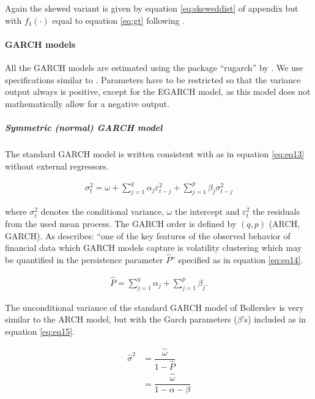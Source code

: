 \documentclass[a4paper, twoside]{templates/ociamthesis}
\begin{document}
\noindent Again the skewed variant is given by equation \eqref{eq:skeweddist} of appendix but with \(f_1(\cdot)\) equal to equation \eqref{eq:gt} following \textcite{trottier2015}.

\hypertarget{garch-models}{%
\paragraph{GARCH models}\label{garch-models}}

All the GARCH models are estimated using the package ``rugarch'' by \textcite{alexios2020}. We use specifications similar to \textcite{ghalanos2020}. Parameters have to be restricted so that the variance output always is positive, except for the EGARCH model, as this model does not mathematically allow for a negative output.

\hypertarget{symmetric-normal-garch-model}{%
\subparagraph{Symmetric (normal) GARCH model}\label{symmetric-normal-garch-model}}

\noindent The standard GARCH model \autocite{bollerslev1986} is written consistent with \textcite{ghalanos2020} as in equation \eqref{eq:eq13} without external regressors.

\begin{align}
\sigma_t^2 = \omega  + \sum\limits_{j = 1}^q {{\alpha_j}\varepsilon _{t-j}^2 +} \sum\limits_{j=1}^p {{\beta_j}\sigma_{t-j}^2} 
 \label{eq:eq13}
\end{align}

\noindent where \(\sigma_t^2\) denotes the conditional variance, \(\omega\) the intercept and \(\varepsilon_t^2\) the residuals from the used mean process. The GARCH order is defined by \((q, p)\) (ARCH, GARCH). As \textcite{ghalanos2020} describes: ``one of the key features of the observed behavior of financial data which GARCH models capture is volatility clustering which may be quantified in the persistence parameter \(\hat{P}\)'' specified as in equation \eqref{eq:eq14}.

\begin{align}
\hat{P} = \sum\limits_{j = 1}^q {{\alpha_j}}  + \sum\limits_{j = 1}^p {{\beta_j}}.
 \label{eq:eq14}
\end{align}

\noindent The unconditional variance of the standard GARCH model of Bollerslev is very similar to the ARCH model, but with the Garch parameters (\(\beta\)'s) included as in equation \eqref{eq:eq15}.

\begin{equation}
\begin{split}
\hat{\sigma}^2 
&= \dfrac{\hat{\omega}}{1 - \hat{P}} \\
&= \dfrac{\hat{\omega}}{1 - \alpha - \beta}
\end{split}
 \label{eq:eq15}
\end{equation}
\end{document}
